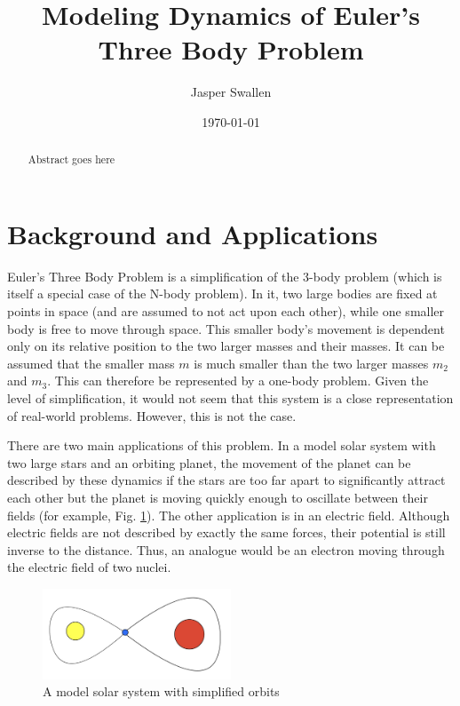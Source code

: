 \documentclass[preprint,titlepage,preprintnumbers,amsmath,amssymb,aps,11pt]{revtex4-2}
\begin{document}
\title{Modeling Dynamics of Euler's Three Body Problem}
\author{Jasper Swallen}
\date{\today}


\begin{abstract}
    Abstract goes here
        {\singlespacing \tableofcontents}
\end{abstract}

\maketitle


\section{Background and Applications}
Euler's Three Body Problem is a simplification of the 3-body problem (which is itself a special case of the N-body problem). In it, two large bodies are fixed at points in space (and are assumed to not act upon each other), while one smaller body is free to move through space. This smaller body's movement is dependent only on its relative position to the two larger masses and their masses. It can be assumed that the smaller mass $m$ is much smaller than the two larger masses $m_2$ and $m_3$. This can therefore be represented by a one-body problem. Given the level of simplification, it would not seem that this system is a close representation of real-world problems. However, this is not the case.

There are two main applications of this problem. In a model solar system with two large stars and an orbiting planet, the movement of the planet can be described by these dynamics if the stars are too far apart to significantly attract each other but the planet is moving quickly enough to oscillate between their fields (for example, Fig. \ref{fig:orbit}). The other application is in an electric field. Although electric fields are not described by exactly the same forces, their potential is still inverse to the distance. Thus, an analogue would be an electron moving through the electric field of two nuclei.

\begin{figure}
    \centering
    \includegraphics[width=0.5\textwidth]{Fig 1.jpeg}
    \caption{A model solar system with simplified orbits}
    \label{fig:orbit}
\end{figure}
\end{document}
